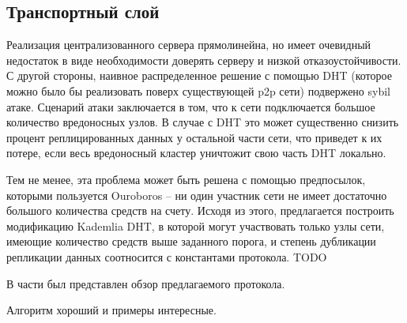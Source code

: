 \documentclass[specification,annotation]{itmo-student-thesis}
\begin{document}
\subsection{Транспортный слой}

Реализация централизованного сервера прямолинейна, но имеет очевидный
недостаток в виде необходимости доверять серверу и низкой
отказоустойчивости. С другой стороны, наивное распределенное решение с
помощью DHT (которое можно было бы реализовать поверх существующей p2p
сети) подвержено sybil атаке. Сценарий атаки заключается в том, что к
сети подключается большое количество вредоносных узлов. В случае с DHT
это может существенно снизить процент реплицированных данных у
остальной части сети, что приведет к их потере, если весь вредоносный
кластер уничтожит свою часть DHT локально.

Тем не менее, эта проблема может быть решена с помощью предпосылок,
которыми пользуется Ouroboros -- ни один участник сети не имеет
достаточно большого количества средств на счету. Исходя из этого,
предлагается построить модификацию Kademlia DHT, в которой могут
участвовать только узлы сети, имеющие количество средств выше
заданного порога, и степень дубликации репликации данных соотносится с
константами протокола. TODO

\chapterconclusion

В части был представлен обзор предлагаемого протокола.

\startconclusionpage

Алгоритм хороший и примеры интересные.

\printmainbibliography
\end{document}
